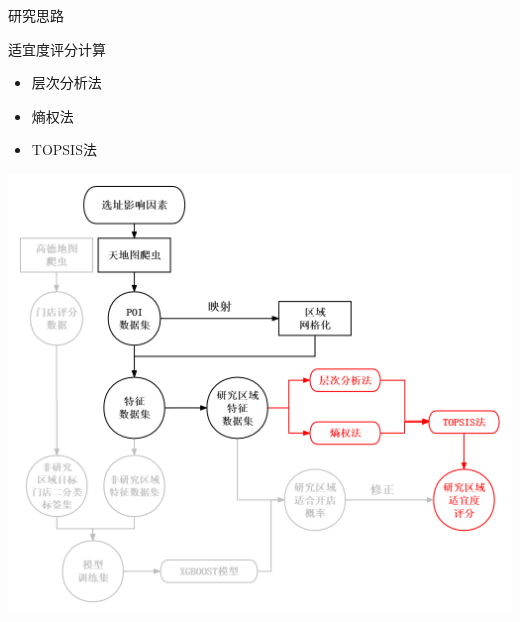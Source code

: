 \documentclass{beamer}
\begin{document}
\begin{frame}{研究思路}   
    \begin{minipage}{0.37\textwidth}
        适宜度评分计算
        \begin{itemize}
            \item 层次分析法
            \item 熵权法
            \item TOPSIS法 
        \end{itemize}
  
      \end{minipage}
      \hfill
      \begin{minipage}{0.6\textwidth}
        \includegraphics[width=1\textwidth]{pic/4.png}
      \end{minipage}
\end{frame}
\end{document}
